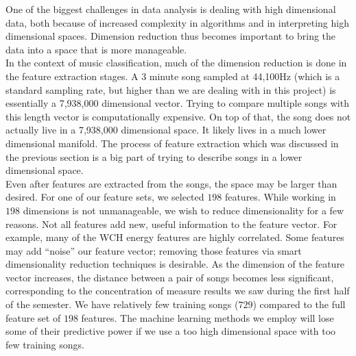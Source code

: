 \documentclass[12pt]{article}
\begin{document}
One of the biggest challenges in data analysis is dealing with high dimensional data, both because of increased complexity in algorithms and in interpreting high dimensional spaces.  Dimension reduction thus becomes important to bring the data into a space that is more manageable.\\

In the context of music classification, much of the dimension reduction is done in the feature extraction stages.  A 3 minute song sampled at 44,100Hz (which is a standard sampling rate, but higher than we are dealing with in this project) is essentially a 7,938,000 dimensional vector.  Trying to compare multiple songs with this length vector is computationally expensive.  On top of that, the song does not actually live in a 7,938,000 dimensional space.  It likely lives in a much lower dimensional manifold.  The process of feature extraction which was discussed in the previous section is a big part of trying to describe songs in a lower dimensional space.\\

Even after features are extracted from the songs, the space may be larger than desired.  For one of our feature sets, we selected $198$ features.  While working in $198$ dimensions is not unmanageable, we wish to reduce dimensionality for a few reasons.  Not all features add new, useful information to the feature vector.  For example, many of the WCH energy features are highly correlated.  Some features may add ``noise'' our feature vector; removing those features via smart dimensionality reduction techniques is desirable.  As the dimension of the feature vector increases, the distance between a pair of songs becomes less significant, corresponding to the concentration of measure results we saw during the first half of the semester.  We have relatively few training songs ($729$) compared to the full feature set of $198$ features.  The machine learning methods we employ will lose some of their predictive power if we use a too high dimensional space with too few training songs.\\
\end{document}
